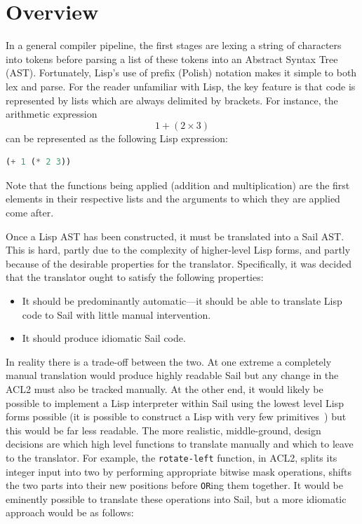 \documentclass[a4paper,12pt,twoside,openright]{report}
\begin{document}
\section{Overview}

In a general compiler pipeline, the first stages are lexing a string of characters into tokens before parsing a list of these tokens into an Abstract Syntax Tree (AST).  Fortunately, Lisp's use of prefix (Polish) notation makes it simple to both lex and parse.  For the reader unfamiliar with Lisp, the key feature is that code is represented by lists which are always delimited by brackets.  For instance, the arithmetic expression \[ 1 + (2 \times 3) \] can be represented as the following Lisp expression:

\begin{lstlisting}[language=lisp]
(+ 1 (* 2 3))
\end{lstlisting}

Note that the functions being applied (addition and multiplication) are the first elements in their respective lists and the arguments to which they are applied come after.

Once a Lisp AST has been constructed, it must be translated into a Sail AST.  This is hard, partly due to the complexity of higher-level Lisp forms, and partly because of the desirable properties for the translator.  Specifically, it was decided that the translator ought to satisfy the following properties:

\begin{itemize}
	\item It should be predominantly automatic---it should be able to translate Lisp code to Sail with little manual intervention.
	\item It should produce idiomatic Sail code.
\end{itemize}

In reality there is a trade-off between the two.  At one extreme a completely manual translation would produce highly readable Sail but any change in the ACL2 must also be tracked manually.  At the other end, it would likely be possible to implement a Lisp interpreter within Sail using the lowest level Lisp forms possible (it is possible to construct a Lisp with very few primitives~\cite{lisp-primitives}) but this would be far less readable.  The more realistic, middle-ground, design decisions are which high level functions to translate manually and which to leave to the translator.  For example, the \texttt{rotate-left} function, in ACL2, splits its integer input into two by performing appropriate bitwise mask operations, shifts the two parts into their new positions before \texttt{OR}ing them together.  It would be eminently possible to translate these operations into Sail, but a more idiomatic approach would be as follows:
\end{document}
